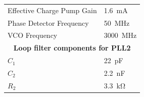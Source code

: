 \begin{table}[tb]
\begin{tabularx}{\textwidth}{Xl}
		Effective Charge Pump Gain                                                & \SI{1.6}{\milli\ampere}  \\
		Phase Detector Frequency                                                  & \SI{50}{\MHz}            \\
		VCO Frequency                                                             & \SI{3000}{\MHz}          \\
		[0.3cm]
	    \multicolumn{2}{c}{\textbf{Loop filter components for PLL2}}   \\
		$C_{1}$                                                                   & \SI{22}{\pico\farad}     \\
		$C_{2}$                                                                   & \SI{2.2}{\nano\farad}    \\
		$R_{2}$                                                                   & \SI{3.3}{\kilo\ohm}      \\ \bottomrule
	\end{tabularx}
\end{table}


